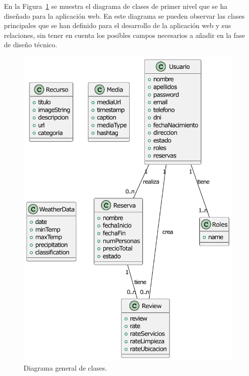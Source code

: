 En la Figura~\ref{fig:diagrama_clases} se muestra el diagrama de clases de primer nivel que se ha diseñado para la aplicación web. En este diagrama se pueden observar las clases principales que se han definido para el desarrollo de la aplicación web y sus relaciones, sin tener en cuenta los posibles campos necesarios a añadir en la fase de diseño técnico.
\begin{figure}
    \centering
    
    \includegraphics[width=1\textwidth]{figs/clases_simple.pdf}
    \caption{Diagrama general de clases.\label{fig:diagrama_clases}}
   
\end{figure}
